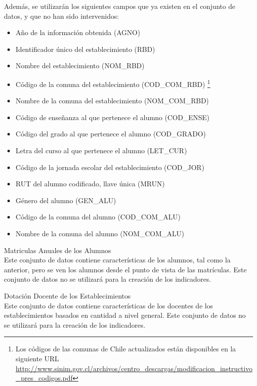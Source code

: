 \begin{longdescription}
        Además, se utilizarán los siguientes campos que ya existen en el conjunto de datos, y que no han sido intervenidos:
            \begin{itemize}
              \item Año de la información obtenida (AGNO)
              \item Identificador único del establecimiento (RBD)
              \item Nombre del establecimiento (NOM\_RBD)
              \item Código de la comuna del establecimiento (COD\_COM\_RBD)
              \footnote{Los códigos de las comunas de Chile actualizados están disponibles en la siguiente URL \url{http://www.sinim.gov.cl/archivos/centro_descargas/modificacion_instructivo_pres_codigos.pdf}}
              \item Nombre de la comuna del establecimiento (NOM\_COM\_RBD)
              \item Código de enseñanza al que pertenece el alumno (COD\_ENSE)
              \item Código del grado al que pertenece el alumno (COD\_GRADO)
              \item Letra del curso al que pertenece el alumno (LET\_CUR)
              \item Código de la jornada escolar del establecimiento (COD\_JOR)
              \item RUT del alumno codificado, llave única (MRUN)
              \item Género del alumno (GEN\_ALU)
              \item Código de la comuna del alumno (COD\_COM\_ALU)
              \item Nombre de la comuna del alumno (NOM\_COM\_ALU)
            \end{itemize}
        \item[Matriculas Anuales de los Alumnos] \hfill \\
        Este conjunto de datos contiene características de los alumnos, tal como la anterior, pero se ven los alumnos desde el punto de vista de las matrículas.
        Este conjunto de datos no se utilizará para la creación de los indicadores.
        
        \item[Dotación Docente de los Establecimientos] \hfill \\
        Este conjunto de datos contiene características de los docentes de los establecimientos basados en cantidad a nivel general. Este conjunto de datos no se utilizará para la creación de los indicadores.
        

\end{longdescription}
